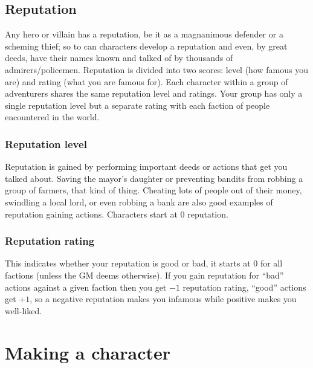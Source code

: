 \documentclass[a4paper,10pt,oneside]{book}
\begin{document}
\section{Reputation}
Any hero or villain has a reputation, be it as a magnanimous defender or a scheming thief; so to can characters develop a reputation and even, by great deeds, have their names known and talked of by thousands of admirers/policemen. Reputation is divided into two scores: level (how famous you are) and rating (what you are famous for). Each character within a group of adventurers shares the same reputation level and ratings. Your group has only a single reputation level but a separate rating with each faction of people encountered in the world.

\subsection{Reputation level}
Reputation is gained by performing important deeds or actions that get you talked about. Saving the mayor's daughter or preventing bandits from robbing a group of farmers, that kind of thing. Cheating lots of people out of their money, swindling a local lord, or even robbing a bank are also good examples of reputation gaining actions.
Characters start at 0 reputation.

\subsection{Reputation rating}
This indicates whether your reputation is good or bad, it starts at 0 for all factions (unless the GM deems otherwise). If you gain reputation for ``bad'' actions against a given faction then you get $-1$ reputation rating, ``good'' actions get $+1$, so a negative reputation makes you infamous while positive makes you well-liked.





\chapter{Making a character}
\end{document}
